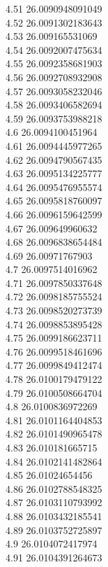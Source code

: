 {4.51	26.0090948091049\\
4.52	26.0091302183643\\
4.53	26.009165531069\\
4.54	26.0092007475634\\
4.55	26.0092358681903\\
4.56	26.0092708932908\\
4.57	26.0093058232046\\
4.58	26.0093406582694\\
4.59	26.0093753988218\\
4.6	26.0094100451964\\
4.61	26.0094445977265\\
4.62	26.0094790567435\\
4.63	26.0095134225777\\
4.64	26.0095476955574\\
4.65	26.0095818760097\\
4.66	26.0096159642599\\
4.67	26.009649960632\\
4.68	26.0096838654484\\
4.69	26.00971767903\\
4.7	26.0097514016962\\
4.71	26.0097850337648\\
4.72	26.0098185755524\\
4.73	26.0098520273739\\
4.74	26.0098853895428\\
4.75	26.0099186623711\\
4.76	26.0099518461696\\
4.77	26.0099849412474\\
4.78	26.0100179479122\\
4.79	26.0100508664704\\
4.8	26.0100836972269\\
4.81	26.0101164404853\\
4.82	26.0101490965478\\
4.83	26.010181665715\\
4.84	26.0102141482864\\
4.85	26.01024654456\\
4.86	26.0102788548325\\
4.87	26.0103110793992\\
4.88	26.0103432185541\\
4.89	26.0103752725897\\
4.9	26.0104072417974\\
4.91	26.0104391264673\\
}
